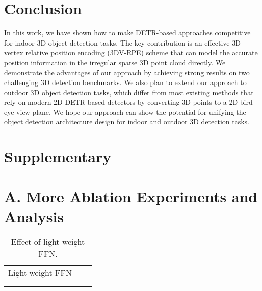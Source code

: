 \documentclass[10pt,twocolumn,letterpaper]{article}
\newcommand{\cmark}{\ding{51}}\newcommand{\xmark}{\ding{55}}
\begin{document}
\section{Conclusion}
In this work, we have shown how to make DETR-based approaches competitive for indoor 3D object detection tasks. The key contribution is an effective 3D vertex relative position encoding (3DV-RPE) scheme that can model the accurate position information in the irregular sparse 3D point cloud directly. We demonstrate the advantages of our approach by achieving strong results on two challenging 3D detection benchmarks. We also plan to extend our approach to outdoor 3D object detection tasks, which differ from most existing methods that rely on modern 2D DETR-based detectors by converting 3D points to a 2D bird-eye-view plane.
We hope our approach can show the potential for unifying the object detection architecture design for indoor and outdoor 3D detection tasks.


{\small


}

\clearpage
\section{Supplementary}

\section*{A. More Ablation Experiments and Analysis}



\begin{table}[t]
\footnotesize
\renewcommand{\arraystretch}{1.2}
\centering
\begin{minipage}{1\linewidth}
{\begin{center}
\resizebox{1.0\linewidth}{!}
{
\begin{tabular}{c|cc}
  Light-weight FFN  &  &  \\
    \shline
  \xmark &  &  \\ 
  \rowcolor{gray!10}\cmark &  &       \\ 
\end{tabular}
}
\end{center}}
\end{minipage}
\caption{\small Effect of light-weight FFN.}
\label{tab:ablate_ffn}
\end{table}
\end{document}
